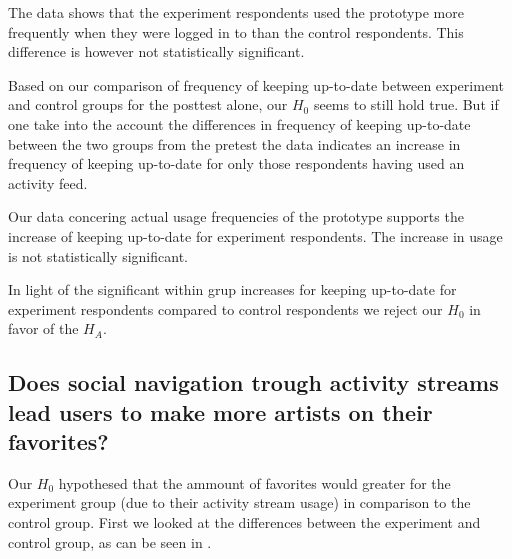 The data shows that the experiment respondents used the prototype more
frequently when they were logged in to \urort{} than the control respondents.
This difference is however not statistically significant.

\parabreak

Based on our comparison of frequency of keeping up-to-date between experiment
and control groups for the posttest alone, our $H_0$ seems to still hold true.
But if one take into the account the differences in frequency of keeping
up-to-date between the two groups from the pretest the data indicates
an increase in frequency of keeping up-to-date for only those respondents
having used an activity feed.

Our data concering actual usage frequencies of the prototype supports the
increase of keeping up-to-date for experiment respondents. The increase in
usage is not statistically significant.

In light of the significant within grup increases for keeping up-to-date
for experiment respondents compared to control respondents
we reject our $H_0$ in favor of the $H_A$.

\subsection{%
  Does social navigation trough activity streams lead users to make
  more artists on \urort{} their favorites?
}

Our $H_0$ hypothesed that the ammount of favorites would greater for the
experiment group (due to their activity stream usage) in comparison to
the control group. First we looked at the differences
between the experiment and control group,
as can be seen in
.

